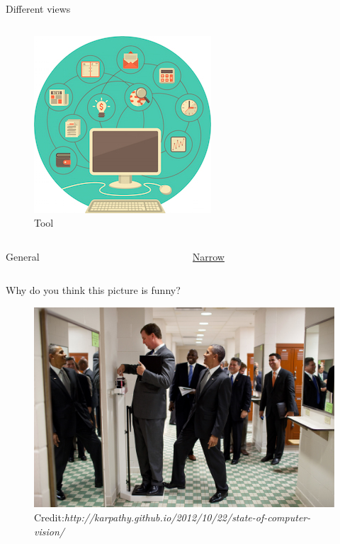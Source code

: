 \begin{frame}{Different views}
\begin{columns}
\begin{column}{.5\textwidth}
			\begin{figure}
				\includegraphics[width=.75\textwidth, center]{figures/WHU-lesson-6}
				\caption*{Tool}
			\end{figure}
		\end{column}
	\end{columns}
	\begin{columns}
		\begin{column}{.5\textwidth}
			\begin{center}
				General
			\end{center}
		\end{column}
		\begin{column}{.5\textwidth}
			\begin{center}
			\href{https://www.youtube.com/watch_popup?v=vIci3C4JkL0}{Narrow}	
			\end{center}
		\end{column}
	\end{columns}
\end{frame}



\begin{frame}{\hypertarget{obama_funny_pic}{Why do you think this picture is funny?}}
	\begin{figure}
		\includegraphics[width=.87\textwidth, center]{figures/obama-funny}
		\caption*{{\tiny Credit:{\em http://karpathy.github.io/2012/10/22/state-of-computer-vision/}}}
	\end{figure}
\end{frame}


